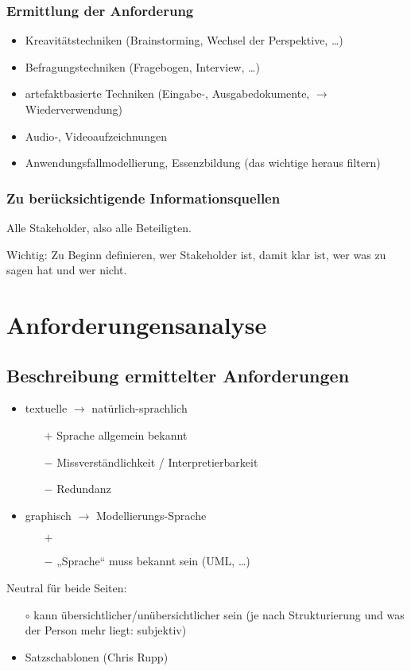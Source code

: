 \subsection{Ermittlung der Anforderung}

\begin{itemize}
\item Kreavitätstechniken (Brainstorming, Wechsel der Perspektive, …)
\item Befragungstechniken (Fragebogen, Interview, …)
\item artefaktbasierte Techniken (Eingabe-, Ausgabedokumente, $\to$ Wiederverwendung)
\item Audio‐, Videoaufzeichnungen
\item Anwendungsfallmodellierung, Essenzbildung (das wichtige heraus filtern)
\end{itemize}

\subsection{Zu berücksichtigende Informationsquellen}

Alle Stakeholder, also alle Beteiligten. 

Wichtig: Zu Beginn definieren, wer Stakeholder ist, damit klar ist, wer was zu sagen hat und wer nicht.

\chapter{Anforderungensanalyse}

\section*{Beschreibung ermittelter Anforderungen}
\begin{itemize}
\item textuelle $\to$ natürlich-sprachlich\\
\begin{itemize}
\item[$+$] Sprache allgemein bekannt
\item[$-$] Missverständlichkeit / Interpretierbarkeit
\item[$-$] Redundanz
\end{itemize}
\item graphisch $\to$ Modellierungs-Sprache
\begin{itemize}
\item[$+$] 
\item[$-$] „Sprache“ muss bekannt sein (UML, …)
\end{itemize}
\end{itemize}
Neutral für beide Seiten:
\begin{itemize}
\item[$\circ$] kann übersichtlicher/unübersichtlicher sein (je nach Strukturierung und was der Person mehr liegt: subjektiv)
\end{itemize}
\begin{itemize}
\item Satzschablonen (Chris Rupp)
\end{itemize}

